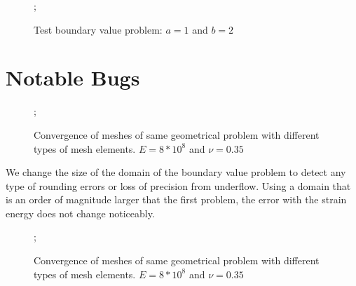 \documentclass{article}
\begin{document}
\begin{figure}
    ;
    \caption{Test boundary value problem: $a = 1$ and $b = 2$}
\centering
\end{figure}

\FloatBarrier

\section{Notable Bugs}

\FloatBarrier

\begin{figure}
    ;
    \caption{Convergence of meshes of same geometrical problem with different types of mesh elements. $E = 8*10^8$ and $\nu = 0.35$}
\centering
\end{figure}
We change the size of the domain of the boundary value problem to detect any type of rounding errors or loss of precision from underflow. Using a domain that is an order of magnitude larger that the first problem, the error with the strain energy does not change noticeably.
\begin{figure}
    ;
    \caption{Convergence of meshes of same geometrical problem with different types of mesh elements. $E = 8*10^8$ and $\nu = 0.35$}
\centering
\end{figure}
\end{document}
